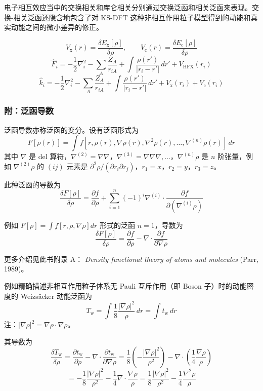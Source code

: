 电子相互效应当中的交换相关和库仑相关分别通过交换泛函和相关泛函来表现。交换-相关泛函还隐含地包含了对 KS-DFT 这种非相互作用粒子模型得到的动能和真实动能之间的微小差异的修正。

\begingroup
\small
\[
V_{\mathrm{x}}(r)=\frac{\delta E_{\mathrm{x}}[\rho]}{\delta \rho},
\qquad
V_{\mathrm{c}}(r)=\frac{\delta E_{\mathrm{c}}[\rho]}{\delta \rho}
\]
\[
\hat F_i
=
-\frac{1}{2}\nabla_i^2
-\sum_A \frac{Z_A}{r_{iA}}
+
\int \frac{\rho(r')}{|r_i-r'|}\,dr'
+
V_{\mathrm{HFX}}(r_i)
\]
\[
\hat k_i
=
-\frac{1}{2}\nabla_i^2
-\sum_A \frac{Z_A}{r_{iA}}
+
\int \frac{\rho(r')}{|r_i-r'|}\,dr'
+
V_{\mathrm{x}}(r_i)
+
V_{\mathrm{c}}(r_i)
\]
\endgroup

\subsubsection*{附：泛函导数}

泛函导数亦称泛函的变分。设有泛函形式为
\[
F[\rho(r)]
=
\int f[r,\rho(r),\nabla\rho(r),\nabla^2\rho(r),\ldots,\nabla^{(n)}\rho(r)]\,dr
\]
其中 $\nabla$ 是 del 算符，$\nabla^{(2)}=\nabla\nabla$，$\nabla^{(3)}=\nabla\nabla\nabla,\ldots$，$\nabla^{(n)}\rho$ 是 $n$ 阶张量，例如 $\nabla^{(2)}\rho$ 的 $(ij)$ 元素是 $\partial^2\rho/(\partial r_i\partial r_j)$，$r_1=x$，$r_2=y$，$r_3=z$。

此种泛函的导数为
\[
\frac{\delta F[\rho]}{\delta \rho}
=
\frac{\partial f}{\partial \rho}
+
\sum_{i=1}^n (-1)^i \nabla^{(i)} \cdot
\frac{\partial f}{\partial (\nabla^{(i)}\rho)}
\]

例如 $F[\rho]=\int f[r,\rho,\nabla\rho]dr$ 形式的泛函 $n=1$，导数为
\[
\frac{\delta F[\rho]}{\delta \rho}
=
\frac{\partial f}{\partial \rho}
-\nabla\cdot\frac{\partial f}{\partial \nabla\rho}
\]

更多介绍见此书附录 A：
\textit{Density functional theory of atoms and molecules} (Parr, 1989)。

例如精确描述非相互作用粒子体系无 Pauli 互斥作用（即 Boson 子）时的动能密度的 Weizs\"acker 动能泛函为
\[
T_{\mathrm{w}}
=
\int \frac{1}{8}\frac{|\nabla\rho|^2}{\rho}\,dr
=
\int t_{\mathrm{w}}\,dr
\]
注：$|\nabla\rho|^2=\nabla\rho\cdot\nabla\rho$。

其导数为
\begingroup
\small
\[
\frac{\delta T_{\mathrm{w}}}{\delta \rho}
=
\frac{\partial t_{\mathrm{w}}}{\partial \rho}
-\nabla\cdot\frac{\partial t_{\mathrm{w}}}{\partial \nabla\rho}
=
\frac{1}{8}\left(-\frac{|\nabla\rho|^2}{\rho^2}\right)
-\nabla\cdot\left(\frac{1}{4}\frac{\nabla\rho}{\rho}\right)
\]
\[
=
-\frac{1}{8}\frac{|\nabla\rho|^2}{\rho^2}
-\frac{1}{4}\nabla\cdot\frac{\nabla\rho}{\rho}
=
\frac{1}{8}\frac{|\nabla\rho|^2}{\rho^2}
-\frac{1}{4}\frac{\nabla^2\rho}{\rho}
\]
\endgroup

